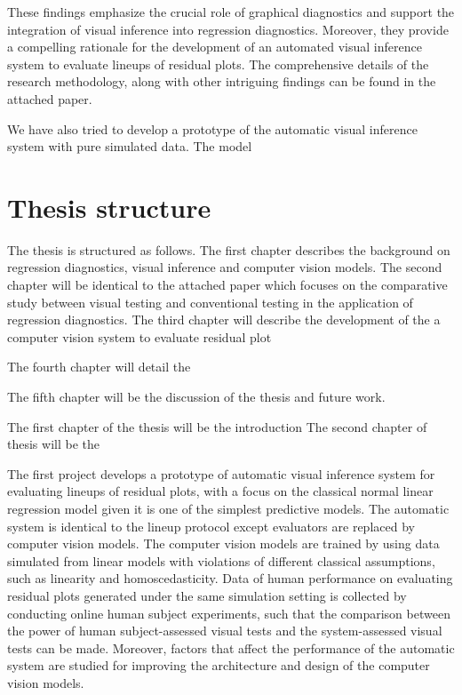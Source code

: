 \documentclass[11pt,a4paper,]{article}
\begin{document}
These findings emphasize the crucial role of graphical diagnostics and support the integration of visual inference into regression diagnostics. Moreover, they provide a compelling rationale for the development of an automated visual inference system to evaluate lineups of residual plots. The comprehensive details of the research methodology, along with other intriguing findings can be found in the attached paper.

We have also tried to develop a prototype of the automatic visual inference system with pure simulated data. The model

\hypertarget{thesis-structure}{%
\section{Thesis structure}\label{thesis-structure}}

The thesis is structured as follows. The first chapter describes the background on regression diagnostics, visual inference and computer vision models. The second chapter will be identical to the attached paper which focuses on the comparative study between visual testing and conventional testing in the application of regression diagnostics. The third chapter will describe the development of the a computer vision system to evaluate residual plot

The fourth chapter will detail the

The fifth chapter will be the discussion of the thesis and future work.

The first chapter of the thesis will be the introduction
The second chapter of thesis will be the

The first project develops a prototype of automatic visual inference system for evaluating lineups of residual plots, with a focus on the classical normal linear regression model given it is one of the simplest predictive models. The automatic system is identical to the lineup protocol except evaluators are replaced by computer vision models. The computer vision models are trained by using data simulated from linear models with violations of different classical assumptions, such as linearity and homoscedasticity. Data of human performance on evaluating residual plots generated under the same simulation setting is collected by conducting online human subject experiments, such that the comparison between the power of human subject-assessed visual tests and the system-assessed visual tests can be made. Moreover, factors that affect the performance of the automatic system are studied for improving the architecture and design of the computer vision models.
\end{document}
